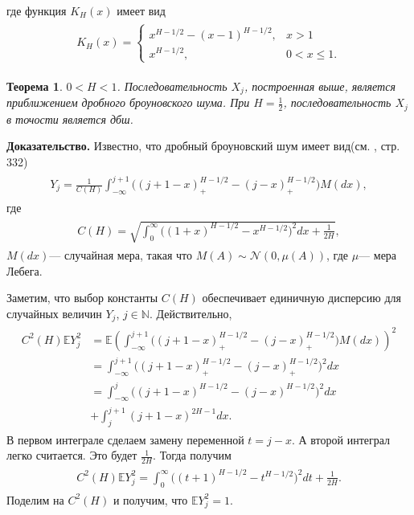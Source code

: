 \documentclass[a4paper,12pt]{article}
\numberwithin{equation}{section}
\newcommand{\N}{\mathbb N}
\newcommand{\dd}{d}
\newtheorem{Theorem}{Теорема}
\begin{document}
	где функция $K_H(x)$ имеет вид
	\begin{align}
	\begin{split}
	K_H(x) = 
	\begin{cases}
	x^{H-1/2} - (x-1)^{H-1/2}, & x>1\\
	x^{H-1/2}, & 0<x\leq 1. 
	\end{cases}
	\end{split}
	\end{align}
	\begin{Theorem}
		$0<H<1$. Последовательность $X_j$, построенная выше, является приближением дробного броуновского шума. При $H=\frac{1}{2}$, последовательность $X_j$ в точости является дбш. 
	\end{Theorem}
	\textbf{Доказательство.} \quad Известно, что дробный броуновский шум имеет вид(см. \cite{Sam}, стр. 332)
	\begin{align}
	\begin{split}\label{integral}
	Y_j = \frac{1}{C(H)}\int_{-\infty}^{j+1} \biggr((j+1-x)_{+}^{H-1/2} - (j-x)_{+}^{H-1/2}  \biggr)M(\dd x),
	\end{split}
	\end{align}
	где 
	\begin{align}
	\begin{split}
	C(H) = \sqrt{\int_0^{\infty} \bigr((1+x)^{H-1/2}-x^{H-1/2} \bigr)^2 \dd x + \frac{1}{2H} },
	\end{split}
	\end{align}
	$M(dx)$--- случайная мера, такая что $M(A) \sim \mathcal{N}(0, \mu(A))$, где $\mu$--- мера Лебега. 
	
	Заметим, что выбор константы $C(H)$ обеспечивает единичную дисперсию для случайных величин $Y_j$, $j \in \N$. Действительно, 
	\begin{align}
	\begin{split}
	C^2(H)\mathbb{E}Y_j^2 &=  \mathbb{E}\left(\int_{-\infty}^{j+1} \bigr((j+1-x)_{+}^{H-1/2} - (j-x)_{+}^{H-1/2}  \bigr)M(\dd x)\right)^2 \\ &= \int_{-\infty}^{j+1} \bigr((j+1-x)_{+}^{H-1/2} - (j-x)_{+}^{H-1/2}  \bigr)^2 \dd x\\ &= \int_{-\infty}^{j} \bigr((j+1-x)^{H-1/2} - (j-x)^{H-1/2}  \bigr)^2 \dd x \\ &+ \int_{j}^{j+1} (j+1-x)^{2H-1} \dd x. 
	\end{split}
	\end{align} 
	В первом интеграле сделаем замену переменной $t = j-x$. А второй интеграл легко считается. Это будет $\frac{1}{2H}$. Тогда получим
	\begin{align}
	\begin{split}
	C^2(H)\mathbb{E}Y_j^2 = \int_{0}^{\infty} \bigr((t+1)^{H-1/2} - t^{H-1/2}  \bigr)^2 \dd t + \frac{1}{2H}. 
	\end{split}
	\end{align} 
	Поделим на $C^2(H)$ и получим, что $\mathbb{E}Y_j^2 = 1$. 
	
\end{document}

